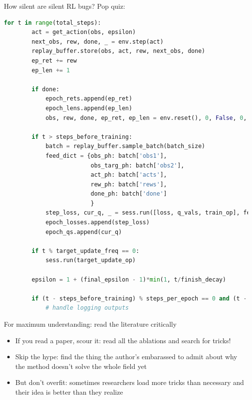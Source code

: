 \documentclass[9pt]{beamer}
\begin{document}
\begin{frame}[fragile]{How silent are silent RL bugs? Pop quiz:}

\begin{lstlisting}[language=python]
    for t in range(total_steps):
        act = get_action(obs, epsilon)
        next_obs, rew, done, _ = env.step(act)
        replay_buffer.store(obs, act, rew, next_obs, done)
        ep_ret += rew
        ep_len += 1

        if done:
            epoch_rets.append(ep_ret)
            epoch_lens.append(ep_len)
            obs, rew, done, ep_ret, ep_len = env.reset(), 0, False, 0, 0

        if t > steps_before_training:
            batch = replay_buffer.sample_batch(batch_size)
            feed_dict = {obs_ph: batch['obs1'],
                         obs_targ_ph: batch['obs2'],
                         act_ph: batch['acts'],
                         rew_ph: batch['rews'],
                         done_ph: batch['done']
                         }
            step_loss, cur_q, _ = sess.run([loss, q_vals, train_op], feed_dict=feed_dict)
            epoch_losses.append(step_loss)
            epoch_qs.append(cur_q)

        if t % target_update_freq == 0:
            sess.run(target_update_op)

        epsilon = 1 + (final_epsilon - 1)*min(1, t/finish_decay)

        if (t - steps_before_training) % steps_per_epoch == 0 and (t - steps_before_training)>0:
            # handle logging outputs
\end{lstlisting}

\end{frame}

\begin{frame}{For maximum understanding: read the literature critically}

\begin{itemize}
\item If you read a paper, scour it: read all the ablations and search for tricks!
\item Skip the hype: find the thing the author's embarassed to admit about why the method doesn't solve the whole field yet
\item But don't overfit: sometimes researchers load more tricks than necessary and their idea is better than they realize
\end{itemize}
\end{frame}
\end{document}

